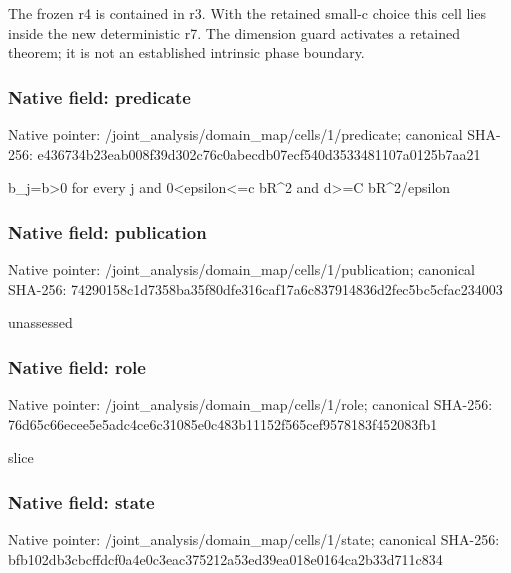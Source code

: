 \documentclass[10pt,a4paper]{article}
\begin{document}
\begingroup\raggedright\sloppy The frozen r4 is contained in r3. With the retained small-c choice this cell lies inside the new deterministic r7. The dimension guard activates a retained theorem;\allowbreak{} it is not an established intrinsic phase boundary.\par\endgroup

\subsubsection{Native field: predicate}
Native pointer: /joint\_\allowbreak{}analysis/domain\_\allowbreak{}map/cells/1/predicate; canonical SHA-256: e436734b23eab008f39d302c76c0abecdb07ecf540d3533481107a0125b7aa21

\begingroup\raggedright\sloppy b\_\allowbreak{}j=\allowbreak{}b>0 for every j and 0<epsilon<=\allowbreak{}c bR\textasciicircum{}2 and d>=\allowbreak{}C bR\textasciicircum{}2/\allowbreak{}epsilon\par\endgroup

\subsubsection{Native field: publication}
Native pointer: /joint\_\allowbreak{}analysis/domain\_\allowbreak{}map/cells/1/publication; canonical SHA-256: 74290158c1d7358ba35f80dfe316caf17a6c837914836d2fec5bc5cfac234003

\begingroup\raggedright\sloppy unassessed\par\endgroup

\subsubsection{Native field: role}
Native pointer: /joint\_\allowbreak{}analysis/domain\_\allowbreak{}map/cells/1/role; canonical SHA-256: 76d65c66ecee5e5adc4ce6c31085e0c483b11152f565cef9578183f452083fb1

\begingroup\raggedright\sloppy slice\par\endgroup

\subsubsection{Native field: state}
Native pointer: /joint\_\allowbreak{}analysis/domain\_\allowbreak{}map/cells/1/state; canonical SHA-256: bfb102db3cbcffdcf0a4e0c3eac375212a53ed39ea018e0164ca2b33d711c834
\end{document}
